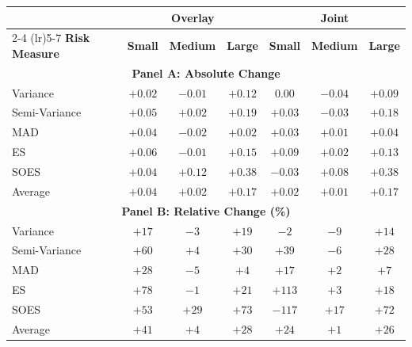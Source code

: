   \begin{tabular}{l*{6}{c}}
    \toprule
                          & \multicolumn{3}{c}{\textbf{Overlay}}             & \multicolumn{3}{c}{\textbf{Joint}} \\
    \cmidrule(lr){2-4} \cmidrule(lr){5-7}
    \textbf{Risk Measure} & \textbf{Small} & \textbf{Medium} & \textbf{Large} & \textbf{Small} & \textbf{Medium} & \textbf{Large} \\
    \midrule
    \multicolumn{7}{c}{\textbf{Panel A: Absolute Change}} \\
    \midrule
    Variance              & $+0.02$ & $-0.01$ & $+0.12$ & $0.00$ & $-0.04$ & $+0.09$ \\
    Semi-Variance         & $+0.05$ & $+0.02$ & $+0.19$ & $+0.03$ & $-0.03$ & $+0.18$ \\
    MAD                   & $+0.04$ & $-0.02$ & $+0.02$ & $+0.03$ & $+0.01$ & $+0.04$ \\
    ES                    & $+0.06$ & $-0.01$ & $+0.15$ & $+0.09$ & $+0.02$ & $+0.13$ \\
    SOES                  & $+0.04$ & $+0.12$ & $+0.38$ & $-0.03$ & $+0.08$ & $+0.38$ \\
    \midrule
    Average               & $+0.04$ & $+0.02$ & $+0.17$ & $+0.02$ & $+0.01$ & $+0.17$ \\
    \midrule
    \multicolumn{7}{c}{\textbf{Panel B: Relative Change (\%)}} \\
    \midrule
    Variance              & $+17$ & $-3$ & $+19$ & $-2$ & $-9$ & $+14$ \\
    Semi-Variance         & $+60$ & $+4$ & $+30$ & $+39$ & $-6$ & $+28$ \\
    MAD                   & $+28$ & $-5$ & $+4$ & $+17$ & $+2$ & $+7$ \\
    ES                    & $+78$ & $-1$ & $+21$ & $+113$ & $+3$ & $+18$ \\
    SOES                  & $+53$ & $+29$ & $+73$ & $-117$ & $+17$ & $+72$ \\
    \midrule
    Average               & $+41$ & $+4$ & $+28$ & $+24$ & $+1$ & $+26$ \\
    \bottomrule
  \end{tabular}
